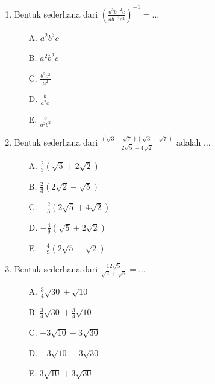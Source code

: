 \documentclass{article}
\begin{document}
\begin{enumerate}
    \item Bentuk sederhana dari $\displaystyle \left( \frac{a^3 b^{-2} c}{ab^{-4} c^2} \right)^{-1} = \dots$
    \begin{multicols}{3}
        \begin{enumerate}
            \item[A.] $a^2b^3c$
            \item[B.] $a^2b^2c$
            \item[C.] $\displaystyle \frac{b^2 c^2}{a^2}$
            \item[D.] $\displaystyle \frac{b}{a^2 c}$
            \item[E.] $\displaystyle \frac{c}{a^2 b^2}$
        \end{enumerate}
    \end{multicols}

    \item Bentuk sederhana dari $\displaystyle \frac{(\sqrt{3} + \sqrt{7})(\sqrt{3} - \sqrt{7})}{2 \sqrt{5} - 4 \sqrt{2}}$ adalah $\dots$
    \begin{multicols}{3}
        \begin{enumerate}
            \item[A.] $\displaystyle \frac{2}{3}(\sqrt{5}+2\sqrt{2})$
            \item[B.] $\displaystyle \frac{2}{3}(2\sqrt{2}-\sqrt{5})$
            \item[C.] $\displaystyle -\frac{2}{3}(2\sqrt{5}+4\sqrt{2})$
            \item[D.] $\displaystyle -\frac{4}{9}(\sqrt{5}+2\sqrt{2})$
            \item[E.] $\displaystyle -\frac{4}{9}(2\sqrt{5}-\sqrt{2})$
        \end{enumerate}
    \end{multicols}

    \item Bentuk sederhana dari $\displaystyle \frac{12\sqrt{5}}{\sqrt{2}+\sqrt{6}}=\dots$
    \begin{multicols}{3}
        \begin{enumerate}
            \item[A.] $\displaystyle \frac{3}{4}\sqrt{30}+\sqrt{10}$
            \item[B.] $\displaystyle \frac{3}{4}\sqrt{30}+\frac{3}{4}\sqrt{10}$
            \item[C.] $\displaystyle -3\sqrt{10}+3\sqrt{30}$
            \item[D.] $\displaystyle -3\sqrt{10}-3\sqrt{30}$
            \item[E.] $\displaystyle 3\sqrt{10}+3\sqrt{30}$
        \end{enumerate}
    \end{multicols}


\end{enumerate}
\end{document}
